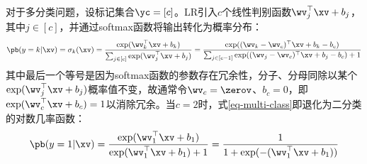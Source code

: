 \documentclass[a4paper,fleqn,fontset=none]{ctexart}
\begin{document}
对于多分类问题，设标记集合$\yc = [c]$。LR引入$c$个线性判别函数$\wv_j^\top \xv + b_j$，其中$j \in [c]$，并通过softmax函数将输出转化为概率分布：
\begin{align} \label{eq-multi-class}
    \pb (y = k | \xv) = \sigma_k (\xv) = \frac{\exp(\wv_k^\top \xv + b_k)}{\sum_{j \in [c]} \exp(\wv_j^\top \xv + b_j)} = \frac{\exp((\wv_k - \wv_c)^\top \xv + b_k - b_c)}{\sum_{j \in [c-1]} \exp((\wv_j - \wv_c)^\top \xv + b_j - b_c) + 1}
\end{align}
其中最后一个等号是因为softmax函数的参数存在冗余性，分子、分母同除以某个$\exp(\wv_j^\top \xv + b_j)$概率值不变，故通常令$\wv_c = \zerov$、$b_c = 0$，即$\exp(\wv_c^\top \xv + b_c) = 1$以消除冗余。当$c=2$时，式\eqref{eq-multi-class}即退化为二分类的对数几率函数：
\begin{align*}
    \pb (y = 1 | \xv) = \frac{\exp(\wv_1^\top \xv + b_1)}{\exp(\wv_1^\top \xv + b_1) + 1} = \frac{1}{1 + \exp(-(\wv_1^\top \xv + b_1))}
\end{align*}
\end{document}
